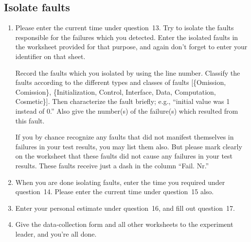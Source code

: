 \subsection*{Isolate faults}

\begin{enumerate}
\addtocounter{enumi}{13}

\item Please enter the current time under question~13.
Try to isolate the faults responsible for the failures which you
detected.
Enter the isolated faults in the worksheet provided for that purpose,
and again don't forget to enter your identifier on that sheet.

Record the faults which you isolated by using the line number.
Classify the faults according to the different types and classes of
faults [\{Omission, Comission\}, \{Initialization, Control,
Interface, Data, Computation, Cosmetic\}]. 
Then characterize the fault briefly; e.g., ``initial value was 1 instead
of 0.''
Also give the number(s) of the failure(s) which resulted from this fault.

If you by chance recognize any faults that did not manifest themselves
in failures in your test results, you may list them also.  But please
mark clearly on the worksheet that these faults did not cause any
failures in your test results. 
These faults receive just a dash in the column ``Fail. Nr.''

\item When you are done isolating faults, enter the time you
required under question~14.  Please enter the current time under
question~15 also. 

\item Enter your personal estimate under question~16, and fill out 
question~17.

\item Give the data-collection form and all other worksheets to the
experiment leader, and you're all done.

\end{enumerate}
